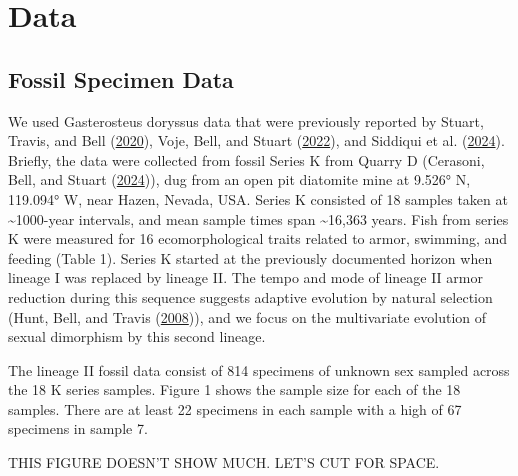 \documentclass[
  12pt,
]{article}
\begin{document}
\hypertarget{sec:data}{%
\section{Data}\label{sec:data}}

\hypertarget{fossil-specimen-data}{%
\subsection{Fossil Specimen Data}\label{fossil-specimen-data}}

We used Gasterosteus doryssus data that were previously reported by
Stuart, Travis, and Bell (\protect\hyperlink{ref-Stuartetal2020}{2020}),
Voje, Bell, and Stuart (\protect\hyperlink{ref-Vojeetal2022}{2022}), and
Siddiqui et al. (\protect\hyperlink{ref-Siddiquietal2024}{2024}).
Briefly, the data were collected from fossil Series K from Quarry D
(Cerasoni, Bell, and Stuart
(\protect\hyperlink{ref-Cerasonietal2024}{2024})), dug from an open pit
diatomite mine at 9.526° N, 119.094° W, near Hazen, Nevada, USA. Series
K consisted of 18 samples taken at \textasciitilde1000-year intervals,
and mean sample times span \textasciitilde16,363 years. Fish from series
K were measured for 16 ecomorphological traits related to armor,
swimming, and feeding (Table 1). Series K started at the previously
documented horizon when lineage I was replaced by lineage II. The tempo
and mode of lineage II armor reduction during this sequence suggests
adaptive evolution by natural selection (Hunt, Bell, and Travis
(\protect\hyperlink{ref-Huntetal2008}{2008})), and we focus on the
multivariate evolution of sexual dimorphism by this second lineage.

The lineage II fossil data consist of 814 specimens of unknown sex
sampled across the 18 K series samples. Figure 1 shows the sample size
for each of the 18 samples. There are at least 22 specimens in each
sample with a high of 67 specimens in sample 7.

THIS FIGURE DOESN'T SHOW MUCH. LET'S CUT FOR SPACE.
\end{document}
